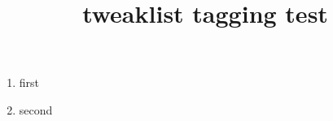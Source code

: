 \documentclass{article}
\title{tweaklist tagging test}
\begin{document}
\begin{enumerate}
\item first
\item second
\end{enumerate}
\end{document}
